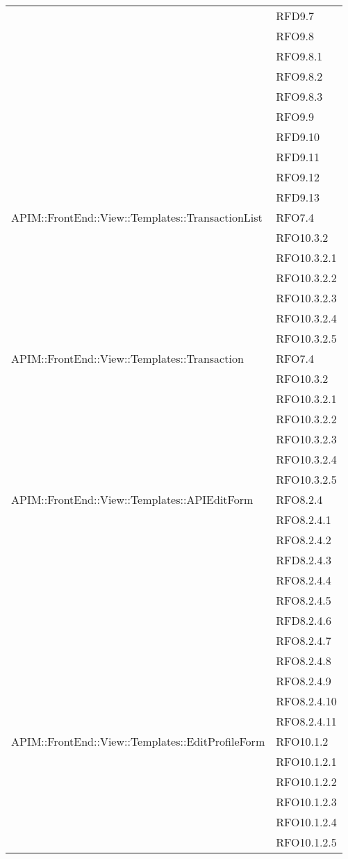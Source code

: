\begin{longtable}{ p{12cm} | p{4cm} }
& RFD9.7 \\
& RFO9.8 \\
& RFO9.8.1 \\
& RFO9.8.2 \\
& RFO9.8.3 \\
& RFO9.9 \\
& RFD9.10 \\
& RFD9.11 \\
& RFO9.12 \\
& RFD9.13 \\	
		    \hline
		    APIM::FrontEnd::View::Templates::TransactionList
		     & RFO7.4 \\
& RFO10.3.2 \\
& RFO10.3.2.1 \\
& RFO10.3.2.2 \\
& RFO10.3.2.3 \\
& RFO10.3.2.4 \\
& RFO10.3.2.5 \\
		    \hline	
		    APIM::FrontEnd::View::Templates::Transaction
		     & RFO7.4 \\
& RFO10.3.2 \\
& RFO10.3.2.1 \\
& RFO10.3.2.2 \\
& RFO10.3.2.3 \\
& RFO10.3.2.4 \\
& RFO10.3.2.5 \\
		    \hline	
		    APIM::FrontEnd::View::Templates::APIEditForm
		    	& RFO8.2.4 \\
& RFO8.2.4.1 \\
& RFO8.2.4.2 \\
& RFD8.2.4.3 \\
& RFO8.2.4.4 \\
& RFO8.2.4.5 \\
& RFD8.2.4.6 \\
& RFO8.2.4.7 \\
& RFO8.2.4.8 \\
& RFO8.2.4.9 \\
& RFO8.2.4.10 \\
& RFO8.2.4.11 \\
		    \hline
		    APIM::FrontEnd::View::Templates::EditProfileForm
		    	& RFO10.1.2 \\
& RFO10.1.2.1 \\
& RFO10.1.2.2 \\
& RFO10.1.2.3 \\
& RFO10.1.2.4 \\
& RFO10.1.2.5 \\

\end{longtable}

